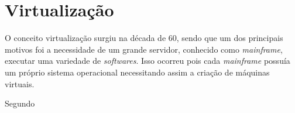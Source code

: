 \chapter{Virtualização}
O conceito virtualização surgiu na década de 60, sendo que um dos principais motivos foi a necessidade de um grande servidor,
conhecido como \textit{mainframe}, executar uma variedade de \textit{softwares}. Isso ocorreu pois cada \textit{mainframe} possuía
um próprio sistema operacional necessitando assim a criação de máquinas virtuais.

Segundo \cite{carissimi2008}

%

